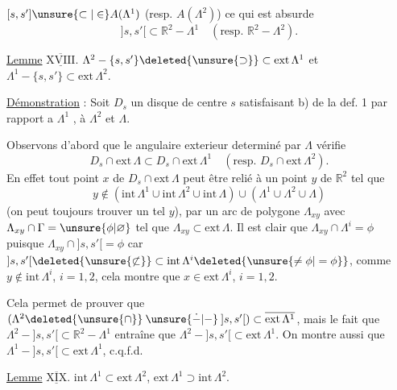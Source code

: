 $[s,s']\unsure{\subset|\in} A(\Lambda^{1})$ (resp. $A(\Lambda^{2})$) ce qui est absurde 
\[
{]s,s'[}\subset\mathbb{R}^{2}-\Lambda^{1}\quad(\text{resp. }\mathbb{R}^{2}-\Lambda^{2}).
\]

\uline{Lemme} $\underline{\overline{\mathrm{XVIII}}}$. $\Lambda^{2}-\{s,s'\}\deleted{\unsure{\supset}}\subset\mathrm{ext}\,\Lambda^{1}$ et $\Lambda^{1}-\{s,s'\}\subset\mathrm{ext}\,\Lambda^{2}$.

\uline{Démonstration} : Soit $D_s$ un disque de centre $s$ satisfaisant b) de la def. 1 par rapport a $\Lambda^{1}$ , à $\Lambda^{2}$ et  $\Lambda$.

Observons d'abord que le  angulaire exterieur  determiné par $\Lambda$ vérifie
\[
D_s\cap\mathrm{ext}\,\Lambda\subset D_s\cap\mathrm{ext}\,\Lambda^{1}\quad(\text{resp. }D_s\cap\mathrm{ext}\,\Lambda^{2}).
\]
En effet tout point $x$ de $D_s\cap\mathrm{ext}\,\Lambda$ peut être relié à un point $y$ de $\mathbb{R}^{2}$ tel que
\[
y\notin(\mathrm{int}\,\Lambda^{1}\cup\mathrm{int}\,\Lambda^{2}\cup\mathrm{int}\,\Lambda)\cup(\Lambda^{1}\cup\Lambda^{2}\cup\Lambda)
\]
 (on peut toujours trouver un tel $y$), par un arc de polygone $\Lambda_{xy}$ avec $\Lambda_{xy}\cap\Gamma=\unsure{\phi|\varnothing}$  tel que $\Lambda_{xy}\subset\mathrm{ext}\,\Lambda$. Il est clair que $\Lambda_{xy}\cap\Lambda^{i}=\phi$ puisque $\Lambda_{xy}\cap{]s,s'[}=\phi$ car $ {]s,s'[}\deleted{\unsure{\not\subset}}\subset\mathrm{int}\,\Lambda^{i}\deleted{\unsure{\ne\phi|=\phi}}$, comme $y\notin\mathrm{int}\,\Lambda^{i}$, $i=1,2$, cela montre que $x\in\mathrm{ext}\,\Lambda^{i}$, $i=1,2$.

Cela permet de prouver que $(\Lambda^{2}\deleted{\unsure{\cap}}\mathbin{\unsure{\dot{-}|-}}{]s,s'[})\subset\overline{\mathrm{ext}\,\Lambda^{1}}$, mais le fait que $\Lambda^{2}-{]s,s'[}\subset\mathbb{R}^{2}-\Lambda^{1}$ entraîne que $\Lambda^{2}-{]s,s'[}\subset\mathrm{ext}\,\Lambda^{1}$. On montre aussi  que $\Lambda^{1}-{]s,s'[}\subset\mathrm{ext}\,\Lambda^{1}$, c.q.f.d.

\uline{Lemme} $\underline{\overline{\mathrm{XIX}}}$. $\mathrm{int}\,\Lambda^{1}\subset\mathrm{ext}\,\Lambda^{2}$, $\mathrm{ext}\,\Lambda^{1}\supset\mathrm{int}\,\Lambda^{2}$.

